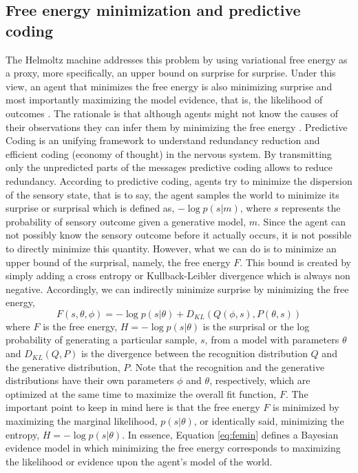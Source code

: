 \documentclass[11pt, onecolumn]{article}
\begin{document}
\subsection{Free energy minimization and predictive coding}
\label{sse:app-pc}
The Helmoltz machine addresses this problem by using variational free energy as a proxy, more specifically, an upper bound on surprise for surprise. Under this view, an agent that minimizes the free energy is also minimizing surprise and most importantly maximizing the model evidence, that is, the likelihood of outcomes \cite{dayan_helmholtz_1995}. The rationale is that although agents might not know the causes of their observations they can infer them by minimizing the free energy \cite{friston_anatomy_2013}.
Predictive Coding is an unifying framework to understand redundancy reduction and efficient coding (economy of thought) in the nervous system. By transmitting only the unpredicted parts of the messages predictive coding allows to reduce redundancy.
According to predictive coding, agents try to minimize the dispersion of the sensory state, that is to say, the agent samples the world to minimize its surprise or surprisal which is defined as, $-\log p(s|m)$, where $s$ represents the probability of sensory outcome given a generative model, $m$. Since the agent can not possibly know the sensory outcome before it actually occurs, it is not possible to directly minimize this quantity. However, what we can do is to minimize an upper bound of the surprisal, namely, the free energy $F$. This bound is created by simply adding a cross entropy or Kullback-Leibler divergence which is always non negative. Accordingly, we can indirectly minimize surprise by minimizing the free energy,
\begin{equation}
F(s,\theta,\phi) = -\log p(s|\theta) + D_{KL}(Q(\phi,s),P(\theta,s))
\label{eq:femin}
\end{equation}
where $F$ is the free energy, $H=-\log p(s|\theta)$ is the surprisal or the log probability of generating a particular sample, $s$, from a model with parameters $\theta$ and $D_{KL}(Q,P)$ is the divergence between the recognition distribution $Q$ and the generative distribution, $P$. Note that the recognition and the generative distributions have their own parameters $\phi$ and $\theta$, respectively, which are optimized at the same time to maximize the overall fit function, $F$. 
The important point to keep in mind here is that the free energy $F$ is minimized by maximizing the marginal likelihood, $p(s|\theta)$, or identically said, minimizing the entropy, $H=-\log p(s|\theta)$. 
In essence, Equation \ref{eq:femin} defines a Bayesian evidence model in which minimizing the free energy corresponds to maximizing the likelihood or evidence upon the agent's model of the world.  
\end{document}
